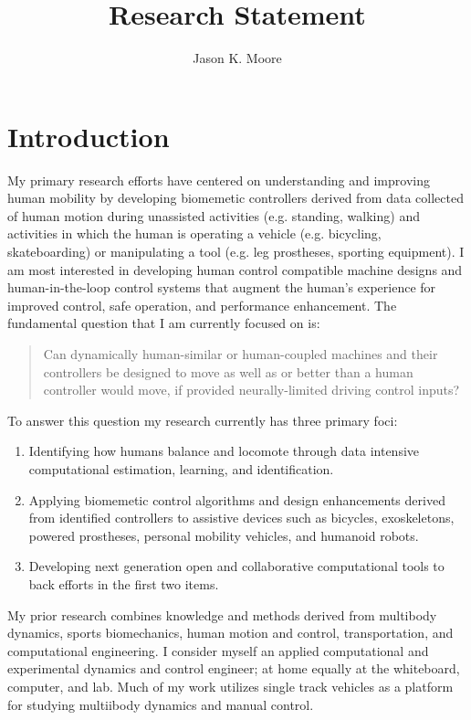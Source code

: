 \documentclass{article}
\title{Research Statement}
\author{Jason K. Moore}
\date{}
\begin{document}
\maketitle

\section*{Introduction}
%
My primary research efforts have centered on understanding and improving human
mobility by developing biomemetic controllers derived from data collected of
human motion during unassisted activities (e.g. standing, walking) and
activities in which the human is operating a vehicle (e.g. bicycling,
skateboarding) or manipulating a tool (e.g. leg prostheses, sporting
equipment). I am most interested in developing human control compatible machine
designs and human-in-the-loop control systems that augment the human's
experience for improved control, safe operation, and performance enhancement.
The fundamental question that I am currently focused on is:
%
\begin{quote}
 Can dynamically human-similar or human-coupled machines and their controllers
 be designed to move as well as or better than a human controller would move,
 if provided neurally-limited driving control inputs?
\end{quote}

To answer this question my research currently has three primary foci:
%
\begin{enumerate}
  \item Identifying how humans balance and locomote through data intensive
    computational estimation, learning, and identification.
  \item Applying biomemetic control algorithms and design enhancements derived
    from identified controllers to assistive devices such as bicycles,
    exoskeletons, powered prostheses, personal mobility vehicles, and humanoid
    robots.
  \item Developing next generation open and collaborative computational tools
    to back efforts in the first two items.
 \end{enumerate}

My prior research combines knowledge and methods derived from multibody
dynamics, sports biomechanics, human motion and control, transportation, and
computational engineering. I consider myself an applied computational and
experimental dynamics and control engineer; at home equally at the whiteboard,
computer, and lab. Much of my work utilizes single track vehicles as a platform
for studying multiibody dynamics and manual control.
\end{document}
